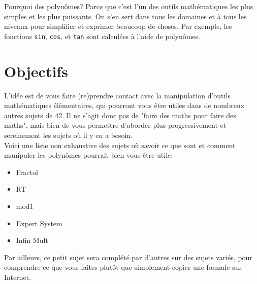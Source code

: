 \documentclass{42}
\begin{document}
    Pourquoi des polynômes? Parce que c'est l'un des outils
    mathématiques les plus simples et les plus puissants. On s'en sert
    dans tous les domaines et à tous les niveaux pour simplifier et
    exprimer beaucoup de choses. Par exemple, les fonctions
    \texttt{sin}, \texttt{cos}, et \texttt{tan} sont calculées à
    l'aide de polynômes.




\chapter{Objectifs}

    L’idée est de vous faire (re)prendre contact avec la manipulation
    d'outils mathématiques élémentaires, qui pourront vous être utiles
    dans de nombreux autres sujets de 42. Il ne s'agit donc pas de
    "faire des maths pour faire des maths", mais bien de vous
    permettre d'aborder plus progressivement et sereinement les sujets
    o\`u il y en a besoin.\\

    Voici une liste non exhaustive des sujets où savoir ce que sont et
    comment manipuler les polynômes pourrait bien vous être utile:\\

	\begin{itemize}\itemsep1pt
        \item Fractol
	    \item RT
	    \item mod1
	    \item Expert System
	    \item Infin Mult\\
    \end{itemize}

    Par ailleurs, ce petit sujet sera complété par d'autres sur des
    sujets variés, pour comprendre ce que vous faites plutôt que
    simplement copier une formule sur Internet.
\end{document}
